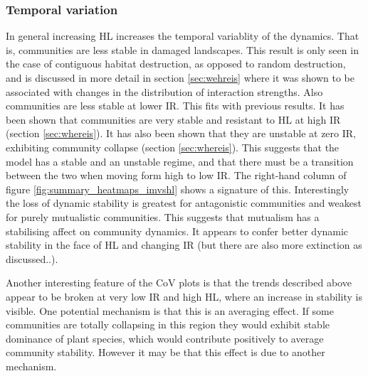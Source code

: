 \begin{itemize}

\subsubsection*{Temporal variation}
 
In general increasing HL increases the temporal variablity of the dynamics. That is, communities are less stable in damaged landscapes. This result is only seen in the case of contiguous habitat destruction, as opposed to random destruction, and is discussed in more detail in section \ref{sec:wehreis} where it was shown to be associated with changes in the distribution of interaction strengths. Also communities are less stable at lower IR. This fits with previous results. It has been shown that communities are very stable and resistant to HL at high IR (section \ref{sec:whereis}). It has also been shown that they are unstable at zero IR, exhibiting community collapse (section \ref{sec:whereis}). This suggests that the model has a stable and an unstable regime, and that there must be a transition between the two when moving form high to low IR. The right-hand column of figure \ref{fig:summary_heatmaps_imvshl} shows a signature of this. Interestingly the loss of dynamic stability is greatest for antagonistic communities and weakest for purely mutualistic communities. This suggests that mutualism has a stabilising affect on community dynamics. It appears to confer better dynamic stability in the face of HL and changing IR (but there are also more extinction as discussed..).

Another interesting feature of the CoV plots is that the trends described above appear to be broken at very low IR and high HL, where an increase in stability is visible. One potential mechanism is that this is an averaging effect. If some communities are totally collapsing in this region they would exhibit stable dominance of plant species, which would contribute positively to average community stability. However it may be that this effect is due to another mechanism.


\end{itemize}
